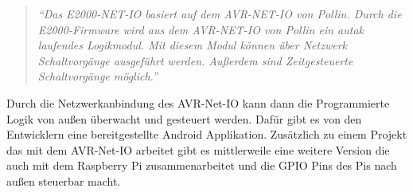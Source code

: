 \begin{quote}
	\textit{
		\enquote{Das E2000-NET-IO basiert auf dem AVR-NET-IO von Pollin. Durch die
		E2000-Firmware wird aus dem AVR-NET-IO von Pollin ein autak laufendes
		Logikmodul. Mit diesem Modul können über Netzwerk Schaltvorgänge ausgeführt
		werden. Außerdem sind Zeitgesteuerte Schaltvorgänge möglich.} }
	\cite{elektronik2000}
\end{quote}

Durch die Netzwerkanbindung des AVR-Net-IO kann dann die Programmierte Logik von
außen überwacht und gesteuert werden. Dafür gibt es von den Entwicklern eine
bereitgestellte Android Applikation. Zusätzlich zu einem Projekt das mit dem
AVR-Net-IO arbeitet gibt es mittlerweile eine weitere Version die auch mit dem
Raspberry Pi zusammenarbeitet und die GPIO Pins des Pis nach außen steuerbar
macht.


